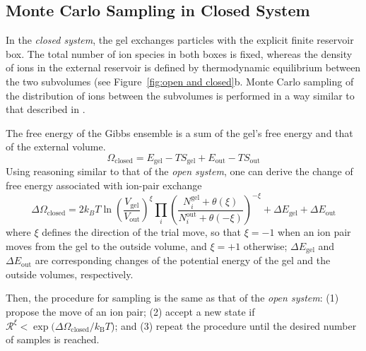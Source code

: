 \documentclass[gels,article,accept,pdftex,moreauthors]{Definitions/mdpi}
\newcommand{\kT}{k_\mathrm{B}T}
\newcommand{\gel}{^\mathrm{gel}}
\newcommand{\out}{^{\mathrm{out}}}
\newcommand{\Vgel}{V_\mathrm{gel}}
\newcommand{\Egel}{E_\mathrm{gel}}
\newcommand{\Sgel}{S_\mathrm{gel}}
\newcommand{\Vout}{V_\mathrm{out}}
\newcommand{\Eout}{E_\mathrm{out}}
\newcommand{\Sout}{S_\mathrm{out}}
\newcommand{\reffig}[1]{Figure~\ref{#1}}
\begin{document}
\subsection{Monte Carlo Sampling in Closed System}

In the \emph{closed system}, the gel exchanges particles with the explicit finite reservoir box. 
The total number of ion species in both boxes is fixed, whereas the density of ions in the external reservoir is defined by thermodynamic equilibrium between the two subvolumes (see \reffig{fig:open and closed}b. Monte Carlo sampling of the distribution of ions between the subvolumes is performed in a way similar to that described in \cite{Panagiotopoulos1988b, Erdos2020}. 

The free energy of the Gibbs ensemble is a sum of the gel's free energy and that of the external volume.
\begin{equation}
    \Omega_{\mathrm{closed}}=\Egel-T\Sgel + \Eout-T\Sout \label{eq:Omega-GC}
\end{equation}
Using reasoning similar to that of the \emph{open system}, one can derive the change of free energy associated with ion-pair exchange 
\begin{equation}
\Delta \Omega_{\mathrm{closed}} =2 k_B T \ln \left(\frac{\Vgel}{\Vout} \right) ^ {\xi}\prod_i \left(\frac{N_{i}\gel+\theta(\xi)}{N_{i}\out+\theta(-\xi)}\right)^{-\xi} + \Delta \Egel + \Delta \Eout
\end{equation}
where $\xi$ defines the direction of the trial move, so that $\xi = -1$ when an ion pair moves from the gel to the outside volume, and  $\xi = +1$ otherwise; $\Delta \Egel$ and $\Delta \Eout$ are corresponding changes of the potential energy of the gel and the outside volumes, respectively.

Then, the procedure for sampling is the same as that of the \emph{open system}: (1) propose the move of an ion pair; (2) accept a new state if $\mathcal{R}^{\xi}<\exp({\Delta\Omega_\mathrm{closed}/\kT}$); and (3) repeat the procedure until the desired number of samples is reached.
\end{document}
